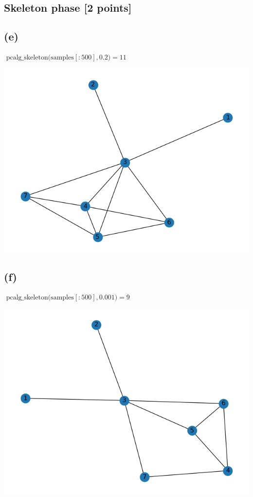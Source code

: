 \documentclass[10pt]{article}
\begin{document}
\subsection{Skeleton phase [2 points]}
\subsection*{(e)}
$\text { pcalg\_skeleton(samples}[: 500], 0.2) = 11$

\includegraphics{images/skel_0.2.png}

\subsection*{(f)}
$\text { pcalg\_skeleton(samples}[: 500], 0.001) = 9$

\includegraphics{images/skel_0.001.png}
\end{document}

